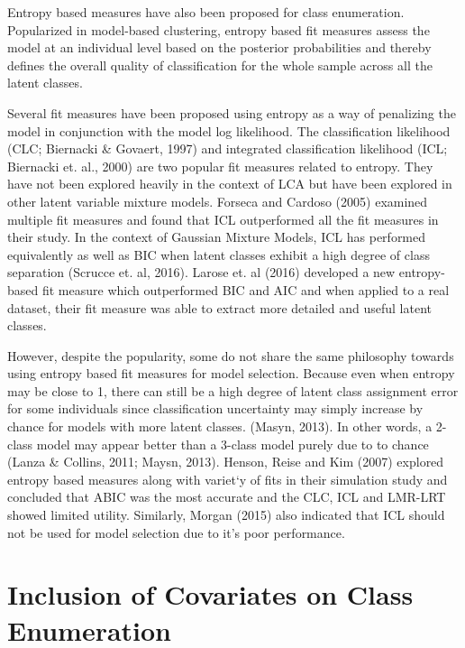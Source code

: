 Entropy based measures have also been proposed for class enumeration. Popularized in model-based clustering, entropy based fit measures assess the model at an individual level based on the posterior probabilities and thereby defines the overall quality of classification for the whole sample across all the latent classes. 

Several fit measures have been proposed using entropy as a way of penalizing the model in conjunction with the model log likelihood. The classification likelihood (CLC; Biernacki \& Govaert, 1997) and integrated classification likelihood (ICL; Biernacki et. al., 2000) are two popular fit measures related to entropy. They have not been explored heavily in the context of LCA but have been explored in other latent variable mixture models. Forseca and Cardoso (2005) examined multiple fit measures and found that ICL outperformed all the fit measures in their study. In the context of Gaussian Mixture Models, ICL has performed equivalently as well as BIC when latent classes exhibit a high degree of class separation (Scrucce et. al, 2016). Larose et. al (2016) developed a new entropy-based fit measure which outperformed BIC and AIC and when applied to a real dataset, their fit measure was able to extract more detailed and useful latent classes. 

However, despite the popularity, some do not share the same philosophy towards using entropy based fit measures for model selection. Because even when entropy may be close to 1, there can still be a high degree of latent class assignment error for some individuals since classification uncertainty may simply increase by chance for models with more latent classes. (Masyn, 2013). In other words, a 2-class model may appear better than a 3-class model purely due to to chance (Lanza \& Collins, 2011; Maysn, 2013). Henson, Reise and Kim (2007) explored  entropy based measures along with variet`y of fits in their simulation study and concluded that ABIC was the most accurate and the CLC, ICL and LMR-LRT showed limited utility. Similarly, Morgan (2015) also indicated that ICL should not be used for model selection due to it's poor performance. 

\section{Inclusion of Covariates on Class Enumeration}

